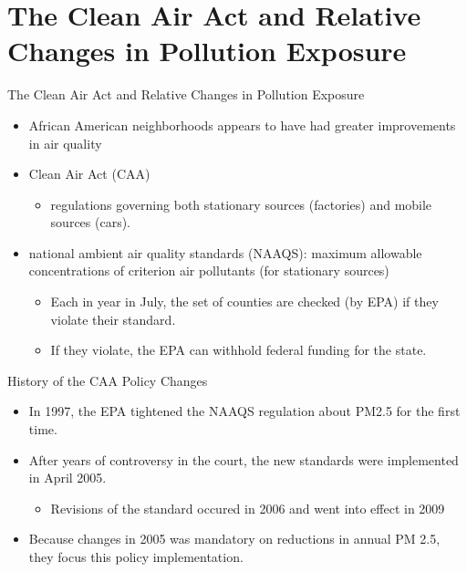 \documentclass[dvipdfmx,12pt]{beamer}
\begin{document}
\section{The Clean Air Act and Relative Changes in Pollution Exposure}
\frame{\sectionpage}
\begin{frame}{The Clean Air Act and Relative Changes in Pollution Exposure}
  \begin{itemize}
    \item African American neighborhoods appears to have had greater improvements in air quality
    \item Clean Air Act (CAA)
    \begin{itemize}
      \item regulations governing both stationary sources (factories) and mobile sources (cars).
    \end{itemize}
    \item national ambient air quality standards (NAAQS): maximum allowable concentrations of criterion air pollutants (for stationary sources)
    \begin{itemize}
      \item Each in year in July, the set of counties are checked (by EPA) if they violate their standard.
      \item If they violate, the EPA can withhold federal funding for the state.
    \end{itemize}
  \end{itemize}
\end{frame}

\begin{frame}{History of the CAA Policy Changes}
  \begin{itemize}
    \item In 1997, the EPA tightened the NAAQS regulation about PM2.5 for the first time.
    \item After years of controversy in the court, the new standards were implemented in April 2005.
    \begin{itemize}
      \item Revisions of the standard occured in 2006 and went into effect in 2009
    \end{itemize}
    \item Because changes in 2005 was mandatory on reductions in annual PM 2.5, they focus this policy implementation.
  \end{itemize}
\end{frame}
\end{document}
